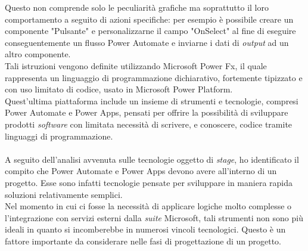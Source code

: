 Questo non comprende solo le peculiarità grafiche ma soprattutto il loro comportamento a seguito di azioni specifiche: per esempio è possibile creare un componente "Pulsante" e personalizzarne il campo "OnSelect" al fine di eseguire conseguentemente un flusso Power Automate e inviarne i dati di \emph{output} ad un altro componente.\\
Tali istruzioni vengono definite utilizzando Microsoft Power Fx, il quale rappresenta un linguaggio di programmazione dichiarativo, fortemente tipizzato e con uso limitato di codice, usato in Microsoft Power Platform.\\
Quest'ultima piattaforma include un insieme di strumenti e tecnologie, compresi Power Automate e Power Apps, pensati per offrire la possibilità di sviluppare prodotti \emph{software} con limitata necessità di scrivere, e conoscere, codice tramite linguaggi di programmazione.\\\\


A seguito dell'analisi avvenuta sulle tecnologie oggetto di \emph{stage}, ho identificato il compito che Power Automate e Power Apps devono avere all'interno di un progetto. 
Esse sono infatti tecnologie pensate per sviluppare in maniera rapida soluzioni relativamente semplici.\\
Nel momento in cui ci fosse la necessità di applicare logiche molto complesse o l'integrazione con servizi esterni dalla \emph{suite} Microsoft, tali strumenti non sono più ideali in quanto si incomberebbe in numerosi vincoli tecnologici.
Questo è un fattore importante da considerare nelle fasi di progettazione di un progetto.\\




